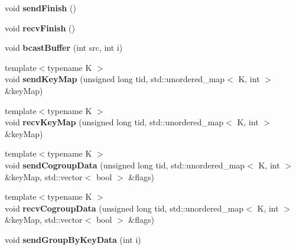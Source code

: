 \begin{DoxyCompactItemize}
\item 
\hypertarget{classfaster_1_1fastComm_ae2e21e08b8a9812d8136d12e171fdbf6}{}void {\bfseries send\+Finish} ()\label{classfaster_1_1fastComm_ae2e21e08b8a9812d8136d12e171fdbf6}

\item 
\hypertarget{classfaster_1_1fastComm_a252c0e9fe5cb45739e4499d096fb0588}{}void {\bfseries recv\+Finish} ()\label{classfaster_1_1fastComm_a252c0e9fe5cb45739e4499d096fb0588}

\item 
\hypertarget{classfaster_1_1fastComm_a8dede6b029fddf4b2196cf5d47dceb7a}{}void {\bfseries bcast\+Buffer} (int src, int i)\label{classfaster_1_1fastComm_a8dede6b029fddf4b2196cf5d47dceb7a}

\item 
\hypertarget{classfaster_1_1fastComm_a90b5d29b062108758932e1eefa22ab64}{}{\footnotesize template$<$typename K $>$ }\\void {\bfseries send\+Key\+Map} (unsigned long tid, std\+::unordered\+\_\+map$<$ K, int $>$ \&key\+Map)\label{classfaster_1_1fastComm_a90b5d29b062108758932e1eefa22ab64}

\item 
\hypertarget{classfaster_1_1fastComm_a4367717fa6627c940d777204a26b0a89}{}{\footnotesize template$<$typename K $>$ }\\void {\bfseries recv\+Key\+Map} (unsigned long tid, std\+::unordered\+\_\+map$<$ K, int $>$ \&key\+Map)\label{classfaster_1_1fastComm_a4367717fa6627c940d777204a26b0a89}

\item 
\hypertarget{classfaster_1_1fastComm_a1794035cdede41cb34034aa85fd510c3}{}{\footnotesize template$<$typename K $>$ }\\void {\bfseries send\+Cogroup\+Data} (unsigned long tid, std\+::unordered\+\_\+map$<$ K, int $>$ \&key\+Map, std\+::vector$<$ bool $>$ \&flags)\label{classfaster_1_1fastComm_a1794035cdede41cb34034aa85fd510c3}

\item 
\hypertarget{classfaster_1_1fastComm_ae7cea23c2c6dc47ac9e115685163d0c9}{}{\footnotesize template$<$typename K $>$ }\\void {\bfseries recv\+Cogroup\+Data} (unsigned long tid, std\+::unordered\+\_\+map$<$ K, int $>$ \&key\+Map, std\+::vector$<$ bool $>$ \&flags)\label{classfaster_1_1fastComm_ae7cea23c2c6dc47ac9e115685163d0c9}

\item 
\hypertarget{classfaster_1_1fastComm_a1c1f95981846c4ef1b5aca1d44ed6fdf}{}void {\bfseries send\+Group\+By\+Key\+Data} (int i)\label{classfaster_1_1fastComm_a1c1f95981846c4ef1b5aca1d44ed6fdf}


\end{DoxyCompactItemize}
